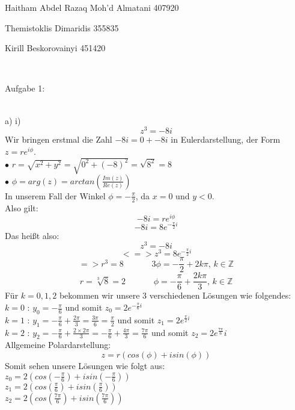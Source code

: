 \documentclass[11pt]{article}
\begin{document}
	\noindent \begin{huge}Haitham Abdel Razaq Moh'd Almatani  407920
	
	\noindent Themistoklis Dimaridis 355835
	
	
	\noindent Kirill Beskorovainyi 	451420\end{huge}\\\vspace{0.05in}
	
		\noindent \begin{Large}Aufgabe 1:\end{Large}\\[2pt]
			\indent a) \hspace{20pt} i)\\
			$$z^3 = -8i$$
			Wir bringen erstmal die Zahl $-8i=0+-8i$ in Eulerdarstellung, der Form $z=re^{i\phi}$.\\
			$\bullet$  $r=\sqrt{x^2+y^2}=\sqrt{0^2+(-8)^2}=\sqrt{8^2}=8$\\
			$\bullet$  $\phi = arg(z) = arctan\left(\frac{Im(z)}{Re(z)}\right)$\\
			\indent \indent In unserem Fall der Winkel $\phi = -\frac{\pi}{2}$, da $x=0$ und $y<0$.\\
			Also gilt:\\
			$$-8i=re^{i\phi}$$
			$$-8i=8e^{-\frac{\pi}{2}i}$$
			Das heißt also:\\
			$$z^3=-8i$$
			$$<=>z^3=8e^{-\frac{\pi}{2}i}$$
			$$=> r^3 = 8 \hspace{40pt} 3\phi = -\frac{\pi}{2}+2k\pi \mbox{, } k\in \mathbb{Z}$$
			$$r=\sqrt[3]{8}=2 \hspace{40pt} \phi = -\frac{\pi}{6}+\frac{2k\pi}{3} \mbox{, } k\in \mathbb{Z}$$
			Für $k=0,1,2$ bekommen wir unsere $3$ verschiedenen Lösungen wie folgendes:\\
			\indent $k=0$ \hspace{10pt}: \hspace{10pt} $y_0=-\frac{\pi}{6}$ und somit $z_0=2e^{-\frac{\pi}{6}i}$\\
			\indent $k=1$ \hspace{10pt}: \hspace{10pt} $y_1=-\frac{\pi}{6} + \frac{2\pi}{3}=\frac{3\pi}{6}=\frac{\pi}{2}$ und somit $z_1=2e^{\frac{\pi}{2}i}$\\
			\indent $k=2$ \hspace{10pt}: \hspace{10pt} $y_2=-\frac{\pi}{6}+\frac{2\times 2 \pi}{3}=-\frac{\pi}{6}+\frac{4\pi}{3}=\frac{7\pi}{6}$ und somit $z_2=2e^\frac{7\pi}{6}i$\\
			Allgemeine Polardarstellung:\\
			$$z=r(cos(\phi)+isin(\phi))$$
\newpage
			Somit sehen unsere Lösungen wie folgt aus:\\
			\indent $z_0=2(cos\left(-\frac{\pi}{6}\right)+isin\left(-\frac{\pi}{6}\right))$\\
			\indent $z_1=2(cos\left(\frac{\pi}{6}\right)+isin\left(\frac{\pi}{6}\right))$\\
			\indent $z_2=2(cos\left(\frac{7\pi}{6}\right)+isin\left(\frac{7\pi}{6}\right))$\\
			
\end{document}
